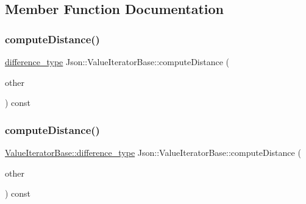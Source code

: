 \subsection{Member Function Documentation}
\hypertarget{class_json_1_1_value_iterator_base_a259064742a8ebd70107f1901bd9bb14b}{}\label{class_json_1_1_value_iterator_base_a259064742a8ebd70107f1901bd9bb14b} 
\subsubsection{\texorpdfstring{compute\+Distance()}{computeDistance()}\hspace{0.1cm}{\footnotesize\ttfamily [1/2]}}
{\footnotesize\ttfamily \hyperlink{class_json_1_1_value_iterator_base_a4e44bf8cbd17ec8d6e2c185904a15ebd}{difference\+\_\+type} Json\+::\+Value\+Iterator\+Base\+::compute\+Distance (\begin{DoxyParamCaption}\item[{const \hyperlink{class_json_1_1_value_iterator_base_a9d2a940d03ea06d20d972f41a89149ee}{Self\+Type} \&}]{other }\end{DoxyParamCaption}) const\hspace{0.3cm}{\ttfamily [protected]}}

\hypertarget{class_json_1_1_value_iterator_base_af11473c9e20d07782e42b52a2f9e4540}{}\label{class_json_1_1_value_iterator_base_af11473c9e20d07782e42b52a2f9e4540} 
\subsubsection{\texorpdfstring{compute\+Distance()}{computeDistance()}\hspace{0.1cm}{\footnotesize\ttfamily [2/2]}}
{\footnotesize\ttfamily \hyperlink{class_json_1_1_value_iterator_base_a4e44bf8cbd17ec8d6e2c185904a15ebd}{Value\+Iterator\+Base\+::difference\+\_\+type} Json\+::\+Value\+Iterator\+Base\+::compute\+Distance (\begin{DoxyParamCaption}\item[{const \hyperlink{class_json_1_1_value_iterator_base_a9d2a940d03ea06d20d972f41a89149ee}{Self\+Type} \&}]{other }\end{DoxyParamCaption}) const\hspace{0.3cm}{\ttfamily [protected]}}



